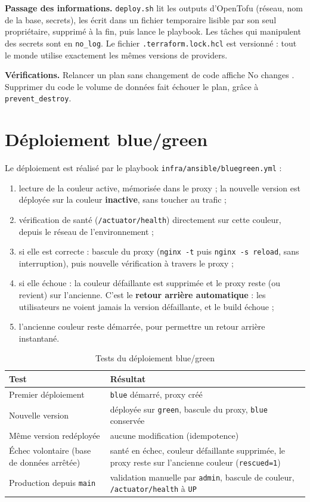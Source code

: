 \documentclass[11pt,a4paper]{report}
\begin{document}
\textbf{Passage des informations.} \texttt{deploy.sh} lit les outputs d'OpenTofu (réseau, nom de la base, secrets), les écrit dans un fichier temporaire lisible par son seul propriétaire, supprimé à la fin, puis lance le playbook. Les tâches qui manipulent des secrets sont en \texttt{no\_log}. Le fichier \texttt{.terraform.lock.hcl} est versionné : tout le monde utilise exactement les mêmes versions de providers.

\textbf{Vérifications.} Relancer un plan sans changement de code affiche \og No changes \fg{}. Supprimer du code le volume de données fait échouer le plan, grâce à \texttt{prevent\_destroy}.

\section{Déploiement blue/green}\label{sec:bluegreen}
Le déploiement est réalisé par le playbook \texttt{infra/ansible/bluegreen.yml} :
\begin{enumerate}
  \item lecture de la couleur active, mémorisée dans le proxy ; la nouvelle version est déployée sur la couleur \textbf{inactive}, sans toucher au trafic ;
  \item vérification de santé (\texttt{/actuator/health}) directement sur cette couleur, depuis le réseau de l'environnement ;
  \item si elle est correcte : bascule du proxy (\texttt{nginx -t} puis \texttt{nginx -s reload}, sans interruption), puis nouvelle vérification à travers le proxy ;
  \item si elle échoue : la couleur défaillante est supprimée et le proxy reste (ou revient) sur l'ancienne. C'est le \textbf{retour arrière automatique} : les utilisateurs ne voient jamais la version défaillante, et le build échoue ;
  \item l'ancienne couleur reste démarrée, pour permettre un retour arrière instantané.
\end{enumerate}

\begin{table}[H]
  \centering
  \small
  \begin{tabularx}{\textwidth}{@{}L{5cm}Y@{}}
    \toprule
    \textbf{Test} & \textbf{Résultat} \\
    \midrule
    Premier déploiement & \texttt{blue} démarré, proxy créé \\
    Nouvelle version & déployée sur \texttt{green}, bascule du proxy, \texttt{blue} conservée \\
    Même version redéployée & aucune modification (idempotence) \\
    Échec volontaire (base de données arrêtée) & santé en échec, couleur défaillante supprimée, le proxy reste sur l'ancienne couleur (\texttt{rescued=1}) \\
    Production depuis \texttt{main} & validation manuelle par \texttt{admin}, bascule de couleur, \texttt{/actuator/health} à \texttt{UP} \\
    \bottomrule
  \end{tabularx}
  \caption{Tests du déploiement blue/green}
\end{table}
\end{document}
